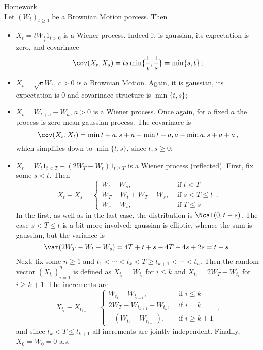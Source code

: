\noindent Homework\hfill\\
Let $(W_t)_{t\geq 0}$ be a Brownian Motion porcess. Then \begin{itemize}
	\item $X_t = tW_{\frac{1}{t}} 1_{t>0}$ is a Wiener process. Indeed it is gaussian,
	its expectation is zero, and covarinace
	\[ \cov(X_t, X_s) = ts \min\{ \frac{1}{t}, \frac{1}{s} \} = \min\{s,t\} \,; \]
	\item $X_t = \sqrt{c}W_{\frac{t}{c}}$, $c>0$ is a Brownian Motion. Again, it is gaussian,
	its expectation is $0$ and covarinace structure is $\min\{t,s\}$;
	\item $X_t = W_{t+a}-W_a$, $a>0$ is a Wiener process. Once again, for a fixed $a$ the
	process is zero-mean gaussian process. The covarinace is 
	\[ \cov(X_s, X_t) = \min{t+a,s+a} - \min{t+a,a} - \min{a,s+a} + a \,, \]
	which simplifies down to $\min\{t,s\}$, since $t,s\geq 0$;
	\item $X_t = W_t 1_{t<T} + (2W_T - W_t)1_{t\geq T}$ is a Wiener process (reflected).
	First, fix some $s < t$. Then \[ X_t-X_s = \begin{cases}
		W_t-W_s, &\text{ if } t<T\\
		W_T-W_t + W_T-W_s, &\text{ if } s<T\leq t\\
		W_s-W_t, &\text{ if } T\leq s
	\end{cases}\,. \]
	In the first, as well as in the last case, the distribution is $\Ncal(0,t-s)$. The
	case $s<T\leq t$ is a bit more involved: gaussian is elliptic, whence the sum is
	gaussian, but the variance is
	\[ \var( 2W_T-W_t-W_s ) = 4T+t+s - 4T - 4s + 2s = t-s \,. \]
	Next, fix some $n\geq1$ and $t_1<\cdots<t_k<T\geq t_{k+1}<\cdots<t_n$. Then the
	random vector $(X_{t_i})_{i=1}^n$ is defined as $X_{t_i} = W_{t_i}$ for $i\leq k$
	and $X_{t_i} = 2W_T - W_{t_i}$ for $i\geq k+1$. The increments are
	\[ X_{t_i}-X_{t_{i-1}} = \begin{cases}
		W_{t_i}-W_{t_{i-1}}, &\text{ if }i\leq k\\
		2W_T - W_{t_{k+1}} - W_{t_k}, &\text{ if }i=k\\
		-(W_{t_i}-W_{t_{i-1}}), &\text{ if }i \geq k+1
	\end{cases} \,,\]
	and since $t_k<T\leq t_{k+1}$ all increments are jointly independent. Finallly,
	$X_0 = W_0 = 0$ a.s.
\end{itemize}

